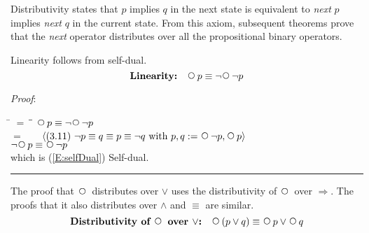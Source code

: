 \documentclass[12pt, fleqn, leqno]{article}
\newcommand{\lgap}{2pt}                             %
\newcommand{\mymathindent}{24pt}                    %
\newcommand{\impl}{\ensuremath{\Rightarrow}}        %
\newcommand{\Next}{\;\,\text{\raisebox{3.5pt}{\circle{6}}}}
\newcommand{\myqed}{\rule[-.23ex]{1.2ex}{2.0ex}}
\newcommand{\myqedtab}{\hspace{384pt}}              %
\newcommand{\Gll} {\langle}                         %
\newcommand{\Ggg} {\rangle}                         %
\newcommand{\Hint}[1]     {\ \ \ $\Gll              \mbox{#1} \Ggg$ }   %
\begin{document}
Distributivity states that $p$ implies $q$ in the next state is equivalent to \textit{next} $p$ implies \textit{next} $q$ in the current state.
From this axiom, subsequent theorems prove that the \textit{next} operator distributes over all the propositional binary operators.

Linearity follows from self-dual.
\begin{equation}\label{E:linearity}
\textbf{Linearity:}\quad \Next p \equiv \neg\Next\neg p
\end{equation}

\emph{Proof}:
\begin{tabbing}
\hspace{\mymathindent} \= $= \;$ \= \myqedtab \= \kill
  \> \>   $\Next p \equiv \neg\Next\neg p$\\[\lgap]
  \> $=$  \>  \Hint{(3.11) $\neg p \equiv q \equiv p \equiv \neg q$ with $p,q := \Next\neg p, \Next p$} \\[\lgap]
  \> \>   $\neg\Next p \equiv \Next\neg p$ \\[\lgap]
  \> which is (\ref{E:selfDual}) Self-dual. \quad \myqed
\end{tabbing}

The proof that $\Next$ distributes over $\lor$ uses the distributivity of $\Next$ over $\impl$.
The proofs that it also distributes over $\land$ and $\equiv$ are similar.
\begin{equation}\label{E:distNextOr}
\textbf{Distributivity of $\Next$ over $\lor$:}\quad \Next (p \lor q) \equiv \Next p \lor \Next q
\end{equation}
\end{document}
